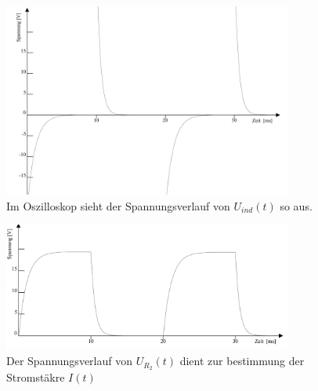 \begin{figure}[h]
\centering
\includegraphics[width=0.85\textwidth]{praktika/mat_praktika/f1c}
\caption{Im Oszilloskop sieht der Spannungsverlauf von \(U_{ind}(t)\) so aus.}
\label{oszbu}
\end{figure}

\begin{figure}[h]
\centering
\includegraphics[width=0.85\textwidth]{praktika/mat_praktika/g1a}
\caption{Der Spannungsverlauf von \(U_{R_{2}}(t)\) dient zur bestimmung der Stromstäkre \(I(t)\)}
\label{oszbi}
\end{figure}

		





%

